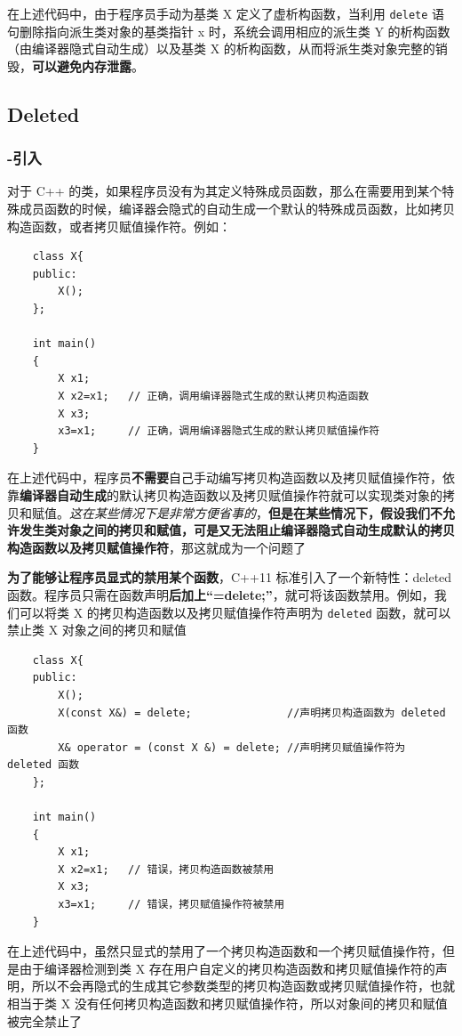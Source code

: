 \documentclass[UTF8,a4paper,12pt]{ctexbook} %
\begin{document}
				 在上述代码中，由于程序员手动为基类 X 定义了虚析构函数，当利用 \verb|delete| 语句删除指向派生类对象的基类指针 x 时，系统会调用相应的派生类 Y 的析构函数（由编译器隐式自动生成）以及基类 X 的析构函数，从而将派生类对象完整的销毁，\textbf{可以避免内存泄露}。
		\subsection{Deleted}
			\subsubsection{-引入}
				对于 C++ 的类，如果程序员没有为其定义特殊成员函数，那么在需要用到某个特殊成员函数的时候，编译器会隐式的自动生成一个默认的特殊成员函数，比如拷贝构造函数，或者拷贝赋值操作符。例如：
					\begin{lstlisting}
	class X{ 
	public: 
		X(); 
	}; 
	
	int main()
	{ 
		X x1; 
		X x2=x1;   // 正确，调用编译器隐式生成的默认拷贝构造函数
		X x3; 
		x3=x1;     // 正确，调用编译器隐式生成的默认拷贝赋值操作符
	}					
					\end{lstlisting}
					
				在上述代码中，程序员\textbf{不需要}自己手动编写拷贝构造函数以及拷贝赋值操作符，依靠\textbf{编译器自动生成}的默认拷贝构造函数以及拷贝赋值操作符就可以实现类对象的拷贝和赋值。\textit{这在某些情况下是非常方便省事的}，\textbf{但是在某些情况下，假设我们不允许发生类对象之间的拷贝和赋值，可是又无法阻止编译器隐式自动生成默认的拷贝构造函数以及拷贝赋值操作符}，那这就成为一个问题了
		
				\textbf{为了能够让程序员显式的禁用某个函数}，C++11 标准引入了一个新特性：deleted 函数。程序员只需在函数声明\textbf{后加上“=delete;”}，就可将该函数禁用。例如，我们可以将类 X 的拷贝构造函数以及拷贝赋值操作符声明为 \verb|deleted| 函数，就可以禁止类 X 对象之间的拷贝和赋值
					\begin{lstlisting}
	class X{			
	public: 
		X(); 
		X(const X&) = delete;               //声明拷贝构造函数为 deleted 函数
		X& operator = (const X &) = delete; //声明拷贝赋值操作符为 deleted 函数
	}; 
	
	int main()
	{ 
		X x1; 
		X x2=x1;   // 错误，拷贝构造函数被禁用
		X x3; 
		x3=x1;     // 错误，拷贝赋值操作符被禁用
	}					
					\end{lstlisting}
				
				在上述代码中，虽然只显式的禁用了一个拷贝构造函数和一个拷贝赋值操作符，但是由于编译器检测到类 X 存在用户自定义的拷贝构造函数和拷贝赋值操作符的声明，所以不会再隐式的生成其它参数类型的拷贝构造函数或拷贝赋值操作符，也就相当于类 X 没有任何拷贝构造函数和拷贝赋值操作符，所以对象间的拷贝和赋值被完全禁止了
				
\end{document}
